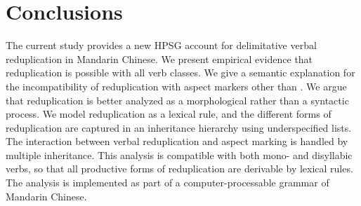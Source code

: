 \section{Conclusions}\label{sec:conclu}

The current study provides a new HPSG account for delimitative verbal reduplication in Mandarin Chinese.
We present empirical evidence that reduplication is possible with all verb classes.
We give a semantic explanation for the incompatibility of reduplication with aspect markers other than .
We argue that reduplication is better analyzed as a morphological rather than a syntactic process.
We model reduplication as a lexical rule,
and the different forms of reduplication are captured in an inheritance hierarchy using underspecified lists.
The interaction between verbal reduplication and aspect marking is handled by multiple inheritance.
This analysis is compatible with both mono- and disyllabic verbs, 
so that all productive forms of reduplication are derivable by lexical rules.
The analysis is implemented as part of a computer-processable grammar of Mandarin Chinese.

